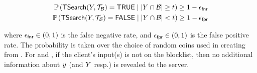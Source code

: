 \begin{align*}
\cprob{}{\thresholdSearchBlocklist(\genericCInputSet, \blklistToken) = \tru}{|\genericCInputSet \cap \blocklist| \ge \threshold} \ge  1 - \fnr\\
\cprob{}{\thresholdSearchBlocklist(\genericCInputSet, \blklistToken) = \fals}{|\genericCInputSet \cap \blocklist| < \threshold} \ge  1 - \fpr\\
\end{align*}


where $\epsilon_\mathsf{fnr} \in (0,1)$ is the false negative rate, and $\epsilon_\mathsf{fpr} \in (0,1)$ is the false positive rate.
The probability is taken over the choice of random coins used in creating \blklistToken from \blocklist. 
%
%
For \searchBlocklist and \thresholdSearchBlocklist,  if the client's input(s) is not on the blocklist, then no additional information about $\genericCInputElmt$ (and $Y$ resp.) is revealed to the server. 


\itemListEnd


